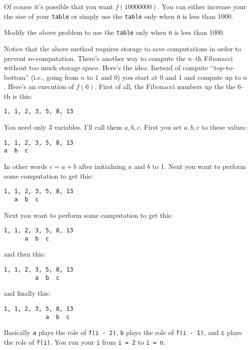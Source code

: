 Of course it's possible that you want $f(10000000)$.
You can either increase your the size of your \verb!table!
or simply use the \verb!table! only when \verb!n! is less than 1000.

\newpage
\begin{ex}
Modify the above problem to use the \verb!table! only when 
\verb!n! is less than 1000.
\end{ex}


\begin{comment}
\newpage
\begin{ex}
Note that we use \verb!table[5]! to store $f(5)$, i.e.,
\verb!table[0, ..., 999]! corresponds to 
$f(0), ..., f(999)$.
What if you want to store 
$f(10)$, ..., $f(1009)$ in \verb!table[0,...,999]! instead?
\end{ex}
\end{comment}

\newpage
Notice that the above method requires storage to save computations
in order to prevent re-computation.
There's another way to compute the $n$--th Fibonacci without too much 
storage space.
Here's the idea:
Instead of compute \lq\lq top-to-bottom''
(i.e., going from $n$ to $1$ and $0$)
you start at $0$ and $1$ and compute up to $n$.
Here's an execution of $f(6)$.
First of all, the Fibonacci numbers up the the $6$--th is this:
\begin{Verbatim}[frame=single, fontsize=\footnotesize]
1, 1, 2, 3, 5, 8, 13
\end{Verbatim}
You need only 3 variables.
I'll call them $a, b, c$.
First you set $a,b,c$ to these values:
\begin{Verbatim}[frame=single, fontsize=\footnotesize]
1, 1, 2, 3, 5, 8, 13
a  b  c
\end{Verbatim}
In other words $c = a + b$ after initializing $a$ and $b$ to 1.
Next you want to perform some computation to get this:
\begin{Verbatim}[frame=single, fontsize=\footnotesize]
1, 1, 2, 3, 5, 8, 13
   a  b  c
\end{Verbatim}
Next you want to perform some computation to get this:
\begin{Verbatim}[frame=single, fontsize=\footnotesize]
1, 1, 2, 3, 5, 8, 13
      a  b  c
\end{Verbatim}
and then this:
\begin{Verbatim}[frame=single, fontsize=\footnotesize]
1, 1, 2, 3, 5, 8, 13
         a  b  c
\end{Verbatim}
and finally this:
\begin{Verbatim}[frame=single, fontsize=\footnotesize]
1, 1, 2, 3, 5, 8, 13
            a  b  c
\end{Verbatim}
Basically \verb!a! plays the role of \verb!f(i - 2)!, 
\verb!b! plays the role of \verb!f(i - 1)!, 
and \verb!c! plays the role of \verb!f(i)!.
You run your \verb!i! from \verb!i = 2! to \verb!i = n!.

